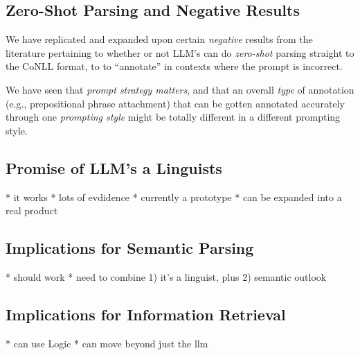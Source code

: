 \label{sec:discussion}

\subsection{Zero-Shot Parsing and Negative Results}
We have replicated and expanded upon certain {\em negative} results from the literature pertaining to whether or not LLM's can do {\em zero-shot} parsing straight to the CoNLL format, to to ``annotate'' in contexts where the prompt is incorrect.

We have seen that {\em prompt strategy matters}, and that an overall {\em type} of annotation (e.g., prepositional phrase attachment) that can be gotten annotated accurately through one {\em prompting style} might be totally different in a different prompting style.

\subsection{Promise of LLM's a Linguists}
* it works
* lots of evdidence
* currently a prototype
* can be expanded into a real product

\subsection{Implications for Semantic Parsing}
* should work
* need to combine 1) it's a linguist, plus 2) semantic outlook

\subsection{Implications for Information Retrieval}
* can use Logic
* can move beyond just the llm